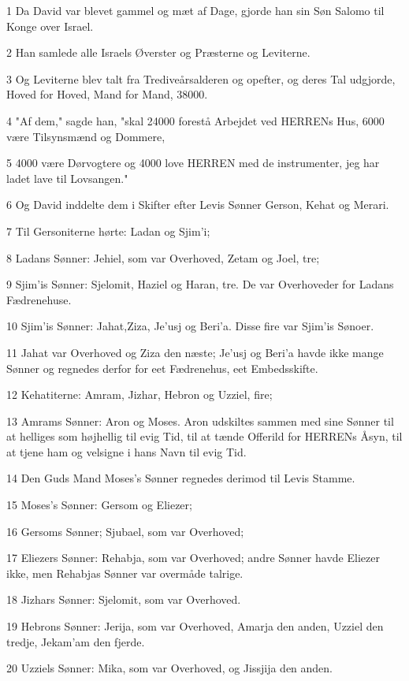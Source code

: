\par 1 Da David var blevet gammel og mæt af Dage, gjorde han sin Søn Salomo til Konge over Israel.
\par 2 Han samlede alle Israels Øverster og Præsterne og Leviterne.
\par 3 Og Leviterne blev talt fra Trediveårsalderen og opefter, og deres Tal udgjorde, Hoved for Hoved, Mand for Mand, 38000.
\par 4 "Af dem," sagde han, "skal 24000 forestå Arbejdet ved HERRENs Hus, 6000 være Tilsynsmænd og Dommere,
\par 5 4000 være Dørvogtere og 4000 love HERREN med de instrumenter, jeg har ladet lave til Lovsangen."
\par 6 Og David inddelte dem i Skifter efter Levis Sønner Gerson, Kehat og Merari.
\par 7 Til Gersoniterne hørte: Ladan og Sjim'i;
\par 8 Ladans Sønner: Jehiel, som var Overhoved, Zetam og Joel, tre;
\par 9 Sjim'is Sønner: Sjelomit, Haziel og Haran, tre. De var Overhoveder for Ladans Fædrenehuse.
\par 10 Sjim'is Sønner: Jahat,Ziza, Je'usj og Beri'a. Disse fire var Sjim'is Sønoer.
\par 11 Jahat var Overhoved og Ziza den næste; Je'usj og Beri'a havde ikke mange Sønner og regnedes derfor for eet Fædrenehus, eet Embedsskifte.
\par 12 Kehatiterne: Amram, Jizhar, Hebron og Uzziel, fire;
\par 13 Amrams Sønner: Aron og Moses. Aron udskiltes sammen med sine Sønner til at helliges som højhellig til evig Tid, til at tænde Offerild for HERRENs Åsyn, til at tjene ham og velsigne i hans Navn til evig Tid.
\par 14 Den Guds Mand Moses's Sønner regnedes derimod til Levis Stamme.
\par 15 Moses's Sønner: Gersom og Eliezer;
\par 16 Gersoms Sønner; Sjubael, som var Overhoved;
\par 17 Eliezers Sønner: Rehabja, som var Overhoved; andre Sønner havde Eliezer ikke, men Rehabjas Sønner var overmåde talrige.
\par 18 Jizhars Sønner: Sjelomit, som var Overhoved.
\par 19 Hebrons Sønner: Jerija, som var Overhoved, Amarja den anden, Uzziel den tredje, Jekam'am den fjerde.
\par 20 Uzziels Sønner: Mika, som var Overhoved, og Jissjija den anden.
